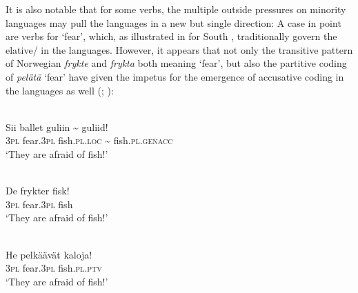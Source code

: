 \documentclass[output=paper]{LSP/langsci}
\begin{document}
 It is also notable that for some verbs, the multiple outside pressures on minority languages may pull the  languages in a new but single direction: A case in point are verbs for ‘fear’, which, as illustrated in  for South , traditionally govern the elative/ in the  languages. However, it appears that not only the transitive pattern of Norwegian \textit{frykte} and  \textit{frykta} both meaning ‘fear’, but also the partitive coding of  \textit{pelätä} ‘fear’ have given the impetus for the emergence of accusative coding in the  languages as well (\cf \citealt[425]{Vuolab-Lohi2007Mailmmi}; \citealt[86–87]{Olthuis2009Mii}):

\begin{exe}
\ex%
\label{16-ki-ex:21}
\\
\gll Sii ballet guliin {\textasciitilde} guliid!\\
 \textsc{3pl} fear.\textsc{3pl} fish.\textsc{pl}.\textsc{loc} {\textasciitilde} fish.\textsc{pl}.\textsc{genacc}\\
\glt ‘They are afraid of fish!’
\end{exe}
 


\begin{exe}
\ex%
\label{16-ki-ex:22}
\\
\gll De frykter fisk!\\
\textsc{3pl} fear.\textsc{3pl} fish\\
\glt ‘They are afraid of fish!’
\end{exe}
 


\begin{exe}
\ex%
\label{16-ki-ex:23}
\\
\gll He pelkäävät kaloja!\\
 \textsc{3pl} fear.\textsc{3pl} fish.\textsc{pl}.\textsc{ptv}\\
\glt ‘They are afraid of fish!’
\end{exe}
\end{document}
